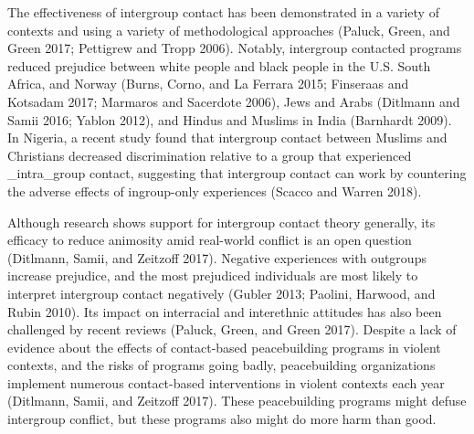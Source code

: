 \documentclass[11pt]{article}
\begin{document}
The effectiveness of intergroup contact has been demonstrated in a
variety of contexts and using a variety of methodological approaches
(Paluck, Green, and Green 2017; Pettigrew and Tropp 2006). Notably,
intergroup contacted programs reduced prejudice between white people and
black people in the U.S. South Africa, and Norway (Burns, Corno, and La
Ferrara 2015; Finseraas and Kotsadam 2017; Marmaros and Sacerdote 2006),
Jews and Arabs (Ditlmann and Samii 2016; Yablon 2012), and Hindus and
Muslims in India (Barnhardt 2009). In Nigeria, a recent study found that
intergroup contact between Muslims and Christians decreased
discrimination relative to a group that experienced \_intra\_group
contact, suggesting that intergroup contact can work by countering the
adverse effects of ingroup-only experiences (Scacco and Warren 2018).

Although research shows support for intergroup contact theory generally,
its efficacy to reduce animosity amid real-world conflict is an open
question (Ditlmann, Samii, and Zeitzoff 2017). Negative experiences with
outgroups increase prejudice, and the most prejudiced individuals are
most likely to interpret intergroup contact negatively (Gubler 2013;
Paolini, Harwood, and Rubin 2010). Its impact on interracial and
interethnic attitudes has also been challenged by recent reviews
(Paluck, Green, and Green 2017). Despite a lack of evidence about the
effects of contact-based peacebuilding programs in violent contexts, and
the risks of programs going badly, peacebuilding organizations implement
numerous contact-based interventions in violent contexts each year
(Ditlmann, Samii, and Zeitzoff 2017). These peacebuilding programs might
defuse intergroup conflict, but these programs also might do more harm
than good.
\end{document}
